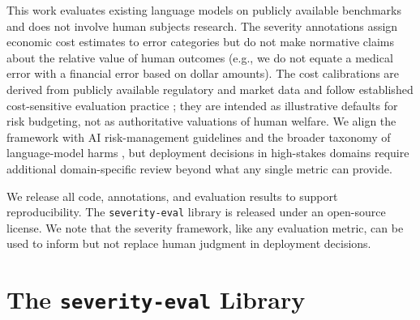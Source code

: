 \documentclass[11pt]{article}
\newcommand{\seveval}{\texttt{severity-eval}}
\begin{document}
This work evaluates existing language models on publicly available
benchmarks and does not involve human subjects research. The severity
annotations assign economic cost estimates to error categories but do
not make normative claims about the relative value of human outcomes
(e.g., we do not equate a medical error with a financial error based
on dollar amounts). The cost calibrations are derived from publicly
available regulatory and market data and follow established
cost-sensitive evaluation practice
\citep{elkan2001foundations,drummond2006cost,ling2008cost}; they
are intended as illustrative defaults for risk budgeting, not as
authoritative valuations of human welfare. We align the framework
with AI risk-management guidelines
\citep{nist2023rmf,euaiact2024,iso42001} and the broader taxonomy
of language-model harms \citep{weidinger2022taxonomy}, but
deployment decisions in high-stakes domains require additional
domain-specific review beyond what any single metric can provide.

We release all code, annotations, and evaluation results to support
reproducibility. The \seveval{} library is released under an open-source
license. We note that the severity framework, like any evaluation
metric, can be used to inform but not replace human judgment
\citep{bergman2024stela} in deployment decisions.


%





\appendix

\section{The \seveval{} Library}
\label{sec:app-library}
\end{document}
